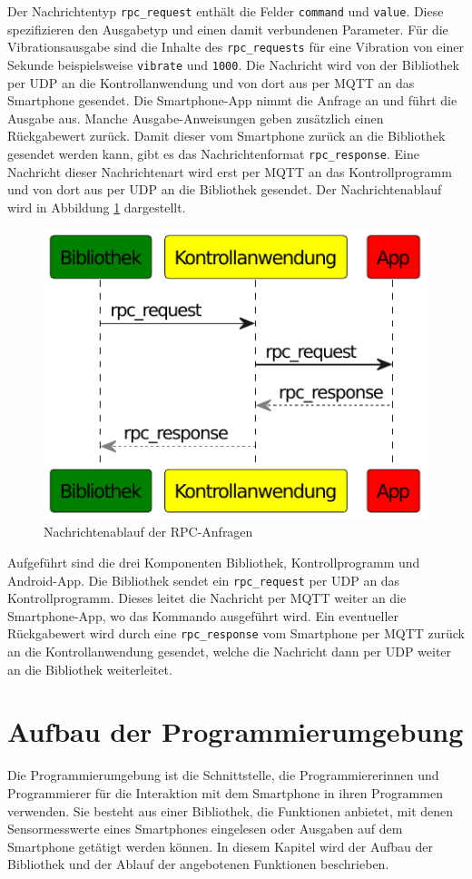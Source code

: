 \documentclass[11pt,a4paper]{report}
\begin{document}
Der Nachrichtentyp \texttt{rpc\_request} enthält die Felder \texttt{command} und \texttt{value}.
Diese spezifizieren den Ausgabetyp und einen damit verbundenen Parameter.
Für die Vibrationsausgabe sind die Inhalte des \texttt{rpc\_requests} für eine Vibration von einer Sekunde beispielsweise \texttt{vibrate} und \texttt{1000}.
Die Nachricht wird von der Bibliothek per UDP an die Kontrollanwendung und von dort aus per MQTT an das Smartphone gesendet.
Die Smartphone-App nimmt die Anfrage an und führt die Ausgabe aus.
Manche Ausgabe-Anweisungen geben zusätzlich einen Rückgabewert zurück.
Damit dieser vom Smartphone zurück an die Bibliothek gesendet werden kann, gibt es das Nachrichtenformat \texttt{rpc\_response}.
Eine Nachricht dieser Nachrichtenart wird erst per MQTT an das Kontrollprogramm und von dort aus per UDP an die Bibliothek gesendet.
Der Nachrichtenablauf wird in Abbildung \ref{fig:message_flow_rpc} dargestellt.
\begin{figure}[htbp]
\centering
\includegraphics[width=.5\textwidth]{images/message_flow_rpc.pdf}
\caption{Nachrichtenablauf der RPC-Anfragen}
\label{fig:message_flow_rpc}
\end{figure}
Aufgeführt sind die drei Komponenten Bibliothek, Kontrollprogramm und Android-App.
Die Bibliothek sendet ein \texttt{rpc\_request} per UDP an das Kontrollprogramm.
Dieses leitet die Nachricht per MQTT weiter an die Smartphone-App, wo das Kommando ausgeführt wird.
Ein eventueller Rückgabewert wird durch eine \texttt{rpc\_response} vom Smartphone per MQTT zurück an die Kontrollanwendung gesendet, welche die Nachricht dann per UDP weiter an die Bibliothek weiterleitet.

\chapter{Aufbau der Programmierumgebung}\label{chap:libs}
Die Programmierumgebung ist die Schnittstelle, die Programmiererinnen und Programmierer für die Interaktion mit dem Smartphone in ihren Programmen verwenden.
Sie besteht aus einer Bibliothek, die Funktionen anbietet, mit denen Sensormesswerte eines Smartphones eingelesen oder Ausgaben auf dem Smartphone getätigt werden können.
In diesem Kapitel wird der Aufbau der Bibliothek und der Ablauf der angebotenen Funktionen beschrieben. 
\end{document}
